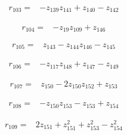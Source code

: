 \par\noindent\begin{minipage}{\linewidth}
\begin{align*}
r_{103}={}&-z_{139}z_{141}+z_{140}-z_{142}
\end{align*}
\end{minipage}\par
\par\noindent\begin{minipage}{\linewidth}
\begin{align*}
r_{104}={}&-z_{19}z_{109}+z_{146}
\end{align*}
\end{minipage}\par
\par\noindent\begin{minipage}{\linewidth}
\begin{align*}
r_{105}={}&z_{143}-z_{144}z_{146}-z_{145}
\end{align*}
\end{minipage}\par
\par\noindent\begin{minipage}{\linewidth}
\begin{align*}
r_{106}={}&-z_{117}z_{148}+z_{147}-z_{149}
\end{align*}
\end{minipage}\par
\par\noindent\begin{minipage}{\linewidth}
\begin{align*}
r_{107}={}&z_{150}-2z_{150}z_{152}+z_{153}
\end{align*}
\end{minipage}\par
\par\noindent\begin{minipage}{\linewidth}
\begin{align*}
r_{108}={}&-z_{150}z_{153}-z_{153}+z_{154}
\end{align*}
\end{minipage}\par
\par\noindent\begin{minipage}{\linewidth}
\begin{align*}
r_{109}={}&2z_{151}+z_{151}^{2}+z_{153}^{2}-z_{154}^{2}
\end{align*}
\end{minipage}\par
